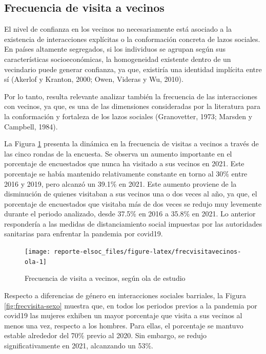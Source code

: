 \documentclass[
  12pt,
]{book}
\begin{document}
\hypertarget{frecuencia-de-visita-a-vecinos}{%
\subsection*{Frecuencia de visita a vecinos}\label{frecuencia-de-visita-a-vecinos}}

El nivel de confianza en los vecinos no necesariamente está asociado a la existencia de interacciones explícitas o la conformación concreta de lazos sociales. En países altamente segregados, si los individuos se agrupan según sus características socioeconómicas, la homogeneidad existente dentro de un vecindario puede generar confianza, ya que, existiría una identidad implícita entre sí (Akerlof y Kranton, 2000; Owen, Videras y Wu, 2010).

Por lo tanto, resulta relevante analizar también la frecuencia de las interacciones con vecinos, ya que, es una de las dimensiones consideradas por la literatura para la conformación y fortaleza de los lazos sociales (Granovetter, 1973; Marsden y Campbell, 1984).

La Figura \ref{fig:frecvisitavecinos-ola} presenta la dinámica en la frecuencia de visitas a vecinos a través de las cinco rondas de la encuesta. Se observa un aumento importante en el porcentaje de encuestados que nunca ha visitado a sus vecinos en 2021. Este porcentaje se había mantenido relativamente constante en torno al 30\% entre 2016 y 2019, pero alcanzó un 39.1\% en 2021. Este aumento proviene de la disminución de quienes visitaban a sus vecinos una o dos veces al año, ya que, el porcentaje de encuestados que visitaba más de dos veces se redujo muy levemente durante el periodo analizado, desde 37.5\% en 2016 a 35.8\% en 2021. Lo anterior respondería a las medidas de distanciamiento social impuestas por las autoridades sanitarias para enfrentar la pandemia por covid19.

\begin{figure}

{\centering \texttt{[image: reporte-elsoc\_files/figure-latex/frecvisitavecinos-ola-1]} 

}

\caption{Frecuencia de visita a vecinos, según ola de estudio}\label{fig:frecvisitavecinos-ola}
\end{figure}

Respecto a diferencias de género en interacciones sociales barriales, la Figura \ref{fig:frecvisita-sexo} muestra que, en todos los periodos previos a la pandemia por covid19 las mujeres exhiben un mayor porcentaje que visita a sus vecinos al menos una vez, respecto a los hombres. Para ellas, el porcentaje se mantuvo estable alrededor del 70\% previo al 2020. Sin embargo, se redujo significativamente en 2021, alcanzando un 53\%.
\end{document}

